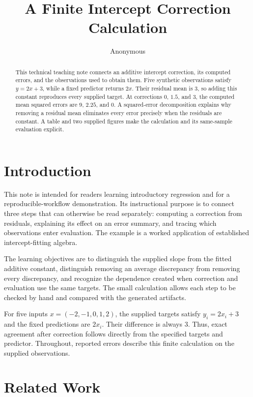 \documentclass[11pt]{article}
\title{A Finite Intercept Correction Calculation}
\author{Anonymous}
\date{}
\begin{document}
\maketitle

\begin{abstract}
This technical teaching note connects an additive intercept correction, its computed errors, and the observations used to obtain them. Five synthetic observations satisfy $y=2x+3$, while a fixed predictor returns $2x$. Their residual mean is $3$, so adding this constant reproduces every supplied target. At corrections $0$, $1.5$, and $3$, the computed mean squared errors are $9$, $2.25$, and $0$. A squared-error decomposition explains why removing a residual mean eliminates every error precisely when the residuals are constant. A table and two supplied figures make the calculation and its same-sample evaluation explicit.
\end{abstract}

\section{Introduction}

This note is intended for readers learning introductory regression and for a reproducible-workflow demonstration. Its instructional purpose is to connect three steps that can otherwise be read separately: computing a correction from residuals, explaining its effect on an error summary, and tracing which observations enter evaluation. The example is a worked application of established intercept-fitting algebra.

The learning objectives are to distinguish the supplied slope from the fitted additive constant, distinguish removing an average discrepancy from removing every discrepancy, and recognize the dependence created when correction and evaluation use the same targets. The small calculation allows each step to be checked by hand and compared with the generated artifacts.

For five inputs $x=(-2,-1,0,1,2)$, the supplied targets satisfy $y_i=2x_i+3$ and the fixed predictions are $2x_i$. Their difference is always $3$. Thus, exact agreement after correction follows directly from the specified targets and predictor. Throughout, reported errors describe this finite calculation on the supplied observations.

\section{Related Work}
\end{document}
